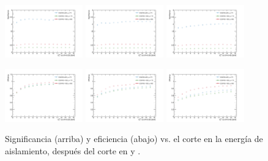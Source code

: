 \begin{figure}[!htbp]
  \centering

  \includegraphics[width=0.3\textwidth]{figures/iso_20_sig}
  \includegraphics[width=0.3\textwidth]{figures/iso_30_sig}
  \includegraphics[width=0.3\textwidth]{figures/iso_40_sig}

  \includegraphics[width=0.3\textwidth]{figures/iso_20_eff}
  \includegraphics[width=0.3\textwidth]{figures/iso_30_eff}
  \includegraphics[width=0.3\textwidth]{figures/iso_40_eff}

  \caption{Significancia (arriba) y eficiencia (abajo) vs. el corte en la energía de
    aislamiento, después del corte en {\pt} y {\met}.}
  \label{fig:photon_iso_sig}
\end{figure}



